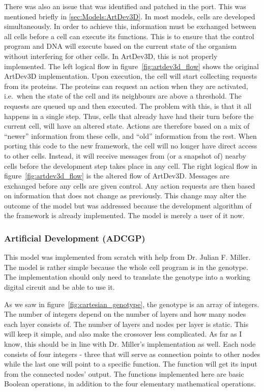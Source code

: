 There was also an issue that was identified and patched in the port. This was mentioned briefly in \ref{sec:Models:ArtDev3D}. In most models, cells are developed simultaneously. In order to achieve this, information must be exchanged between all cells before a cell can execute its functions. This is to ensure that the control program and DNA will execute based on the current state of the organism without interfering for other cells. In ArtDev3D, this is not properly implemented. The left logical flow in figure~\ref{fig:artdev3d_flow} shows the original ArtDev3D implementation. Upon execution, the cell will start collecting requests from its proteins. The proteins can request an action when they are activated, i.e.\ when the state of the cell and its neighbours are above a threshold. The requests are queued up and then executed. The problem with this, is that it all happens in a single step. Thus, cells that already have had their turn before the current cell, will have an altered state. Actions are therefore based on a mix of ``newer'' information from these cells, and ``old'' information from the rest. When porting this code to the new framework, the cell will no longer have direct access to other cells. Instead, it will receive messages from (or a snapshot of) nearby cells before the development step takes place in any cell. The right logical flow in figure~\ref{fig:artdev3d_flow} is the altered flow of ArtDev3D. Messages are exchanged before any cells are given control. Any action requests are then based on information that does not change as previously. This change may alter the outcome of the model but was addressed because the development algorithm of the framework is already implemented. The model is merely a user of it now.


\subsubsection{Artificial Development (ADCGP)}
\label{sec:cartesian}
This model was implemented from scratch with help from Dr. Julian F. Miller. The model is rather simple because the whole cell program is in the genotype. The implementation should only need to translate the genotype into a working digital circuit and be able to use it.

As we saw in figure~\ref{fig:cartesian_genotype}, the genotype is an array of integers. The number of integers depend on the number of layers and how many nodes each layer consists of. The number of layers and nodes per layer is static. This will keep it simple, and also make the crossover less complicated. As far as I know, this should be in line with Dr. Miller's implementation as well. Each node consists of four integers - three that will serve as connection points to other nodes while the last one will point to a specific function. The function will get its input from the connected nodes' output. The functions implemented here are basic Boolean operations, in addition to the four elementary mathematical operations.

